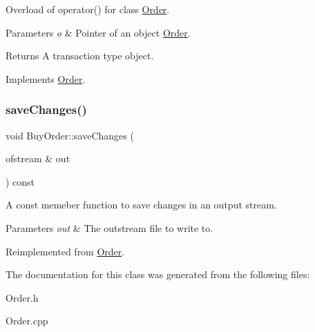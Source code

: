 Overload of operator() for class \hyperlink{class_order}{Order}. 
\begin{DoxyParams}{Parameters}
{\em o} & Pointer of an object \hyperlink{class_order}{Order}. \\
\hline
\end{DoxyParams}
\begin{DoxyReturn}{Returns}
A transaction type object. 
\end{DoxyReturn}


Implements \hyperlink{class_order_a85d5de18c8664085619e3a5c74d47a25}{Order}.

\hypertarget{class_buy_order_aa4f087d0dbc1f6e8937c0b3679fc2f7b}{}\label{class_buy_order_aa4f087d0dbc1f6e8937c0b3679fc2f7b} 
\subsubsection{\texorpdfstring{save\+Changes()}{saveChanges()}}
{\footnotesize\ttfamily void Buy\+Order\+::save\+Changes (\begin{DoxyParamCaption}\item[{ofstream \&}]{out }\end{DoxyParamCaption}) const\hspace{0.3cm}{\ttfamily [virtual]}}

A const memeber function to save changes in an output stream. 
\begin{DoxyParams}{Parameters}
{\em out} & The outstream file to write to. \\
\hline
\end{DoxyParams}


Reimplemented from \hyperlink{class_order_a83989bde0a9b40cbeb0e87c965f6096e}{Order}.



The documentation for this class was generated from the following files\+:\begin{DoxyCompactItemize}
\item 
Order.\+h\item 
Order.\+cpp\end{DoxyCompactItemize}
